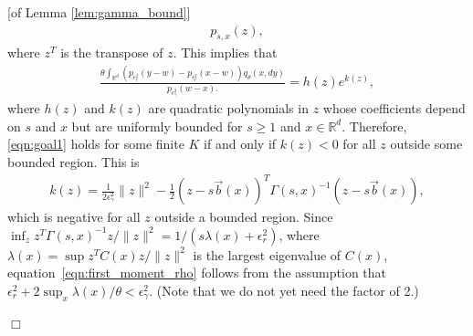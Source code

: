 \documentclass[12pt]{article}
\newenvironment {proof}{{\noindent\bf Proof }}{\hfill $\Box$ \medskip}
\newcommand{\IR}{\mathbb R}
\newcommand{\meanq}{\vec b}    %
\newcommand{\covq}{C}     %
\begin{document}
\begin{proof}[of Lemma \ref{lem:gamma_bound}]
\begin{align*}
        p_{s, x}(z) ,
    \end{align*}
    where $z^T$ is the transpose of $z$.
    This implies that
    \begin{align*}
        \frac{
        \theta
            \int_{\IR^d}
                ( p_{\epsilon_r^2}(y-w) - p_{\epsilon_r^2}(x-w) )
            q_\theta(x, dy)
        }{
            p_{\epsilon^2_\gamma}(w-x) .
        }
        =
        h(z) e^{k(z)},
    \end{align*}
    where $h(z)$ and $k(z)$ are quadratic polynomials in $z$
    whose coefficients depend on $s$ and $x$ but are uniformly bounded for $s \ge 1$
    and $x \in \IR^d$.
    Therefore, \eqref{eqn:goal1} holds for some finite $K$
    if and only if $k(z) < 0$ for all $z$ outside some bounded region.
    This is
    \begin{align*}
        k(z)
        =
        \frac{1}{2\epsilon_\gamma^2} \|z\|^2
        -\frac{1}{2} (z - s\meanq(x))^T \Gamma(s,x)^{-1} (z - s\meanq(x)) ,
    \end{align*}
    which is negative for all $z$ outside a bounded region.
    Since $\inf_z z^T \Gamma(s,x)^{-1} z / \|z\|^2 = 1 / (s \lambda(x) + \epsilon_r^2)$,
    where $\lambda(x) = \sup z^T \covq(x) z / \|z\|^2$ is the largest eigenvalue of $\covq(x)$,
    equation~\eqref{eqn:first_moment_rho} follows from the assumption
    that $\epsilon_r^2 + 2 \sup_x \lambda(x)/\theta < \epsilon_\gamma^2$.
    (Note that we do not yet need the factor of 2.)


\end{proof}
\end{document}
